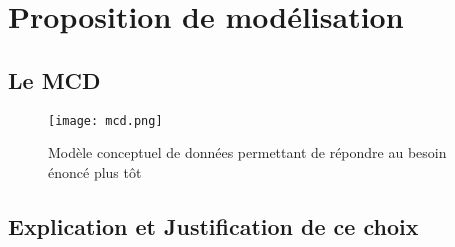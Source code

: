 \chapter{Proposition de modélisation}

\section{Le MCD}

\begin{figure}[!h]
\begin{center}
\texttt{[image: mcd.png]}
\end{center}
\caption{Modèle conceptuel de données permettant de répondre au besoin énoncé plus tôt}
\end{figure}

\section{Explication et Justification de ce choix}